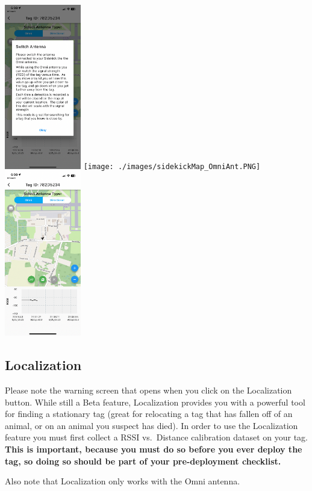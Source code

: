 \documentclass[
]{article}
\begin{document}
\includegraphics[width=0.25\textwidth,height=\textheight]{./images/sidekickMap_ConnectOmniTip.PNG}
\texttt{[image: ./images/sidekickMap\_OmniAnt.PNG]}
\includegraphics[width=0.25\textwidth,height=\textheight]{./images/sidekickMap_chooseAntenna.PNG}

\hypertarget{localization}{%
\subsection{Localization}\label{localization}}

Please note the warning screen that opens when you click on the
Localization button. While still a Beta feature, Localization provides
you with a powerful tool for finding a stationary tag (great for
relocating a tag that has fallen off of an animal, or on an animal you
suspect has died). In order to use the Localization feature you must
first collect a RSSI vs.~Distance calibration dataset on your tag.
\textbf{This is important, because you must do so before you ever deploy
the tag, so doing so should be part of your pre-deployment checklist.}

Also note that Localization only works with the Omni antenna.
\end{document}
